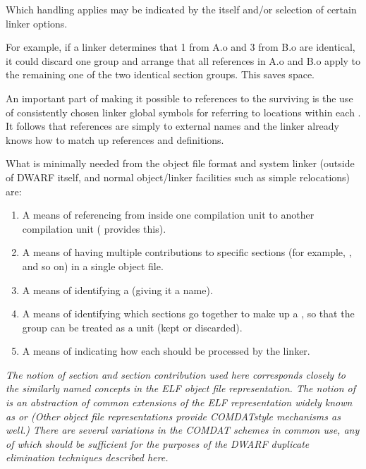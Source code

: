 Which handling applies may be indicated by the 
itself and/or selection of certain linker options.

For example, if a linker determines that 
 1
from A.o and 
 3 from B.o are identical, it could
discard one group and arrange that all references in A.o and
B.o apply to the remaining one of the two identical section
groups. This saves space.

An important part of making it possible to 
references to the surviving 
 is the use of
consistently chosen linker global symbols for referring to
locations within each 
.
It follows that references
are simply to external names and the linker already knows
how to match up references and definitions.

What is minimally needed from the object file format and system
linker (outside of DWARF itself, and normal object/linker
facilities such as simple relocations) are:
\begin{enumerate}[1. ]

\item A means of referencing from inside one \dotdebuginfo{}
compilation unit to another 
\dotdebuginfo{} compilation unit
(\DWFORMrefaddr{} provides this).

\item A means of having multiple contributions to specific sections
(for example, \dotdebuginfo{}, and so on) in a single object file.

\item  A means of identifying a  (giving it a name).

\item A means of identifying which sections go together to make
up a , 
so that the group can be treated as a unit
(kept or discarded).

\item  A means of indicating how each  should be
processed by the linker.

\end{enumerate}

\textit{The notion of section and section contribution used here
corresponds closely to the similarly named concepts in the
ELF object file representation. 
The notion of  is
an abstraction of common extensions of the ELF representation
widely known as  or  (Other
object file representations provide COMDAT\dash style mechanisms as
well.) There are several variations in the COMDAT schemes in
common use, any of which should be sufficient for the purposes
of the 
DWARF duplicate elimination techniques described here.}

